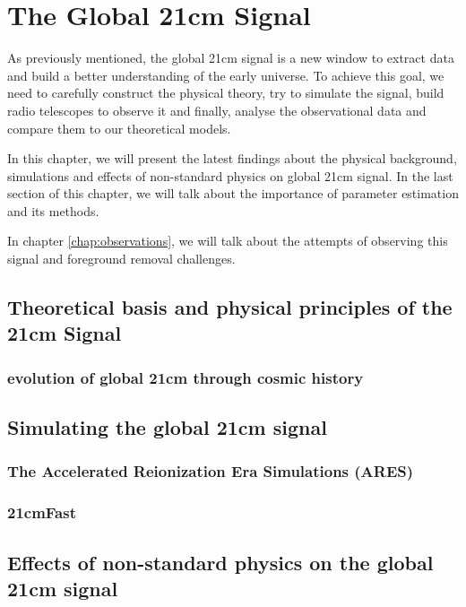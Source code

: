 \documentclass[12pt, TexShade, letterpaper]{report}
\begin{document}
\chapter{The Global 21cm Signal}
\label{chap:global21cm}
As previously mentioned, the global 21cm signal is a new window to extract data and build a better understanding of the early universe. To achieve this goal, we need to carefully construct the physical theory, try to simulate the signal, build radio telescopes to observe it and finally, analyse the observational data and compare them to our theoretical models.\par
In this chapter, we will present the latest findings about the physical background, simulations and effects of non-standard physics on global 21cm signal. In the last section of this chapter, we will talk about the importance of parameter estimation and its methods.\par
In chapter \ref{chap:observations}, we will talk about the attempts of observing this signal and foreground removal challenges.\par
\section{Theoretical basis and physical principles of the 21cm Signal}
\subsection{evolution of global 21cm through cosmic history}


\section{Simulating the global 21cm signal}
\subsection{The Accelerated Reionization Era Simulations (ARES)}
\subsection{21cmFast}
\section{Effects of non-standard physics on the global 21cm signal}
\label{chap:global21cm,sub:non_standard}
\end{document}
